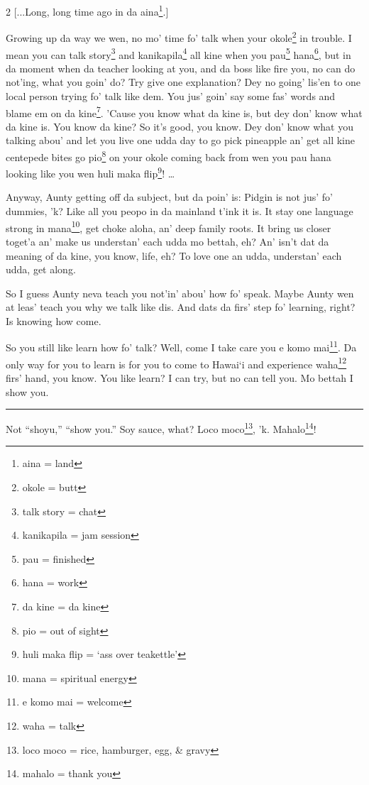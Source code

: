 \documentclass[12pt]{article}%
\begin{document}
\begin{multicols}{2}
[...Long, long time ago in da aina\footnote{aina = land}.]

Growing up da way we wen, no mo' time fo' talk when your okole\footnote{okole = butt} in trouble. I mean you can talk story\footnote{talk story = chat} and kanikapila\footnote{kanikapila = jam session} all kine when you pau\footnote{pau = finished} hana\footnote{hana = work}, but in da moment when da teacher looking at you, and da boss like fire you, no can do not'ing, what you goin' do? Try give one explanation? Dey no going' lis'en to one local person trying fo' talk like dem. You jus' goin' say some fas' words and blame em on da kine\footnote{da kine = da kine}. 'Cause you know what da kine is, but dey don' know what da kine is. You know da kine? So it's good, you know. Dey don' know what you talking abou' and let you live one udda day to go pick pineapple an' get all kine centepede bites go pio\footnote{pio = out of sight} on your okole coming back from wen you pau hana looking like you wen huli maka flip\footnote{huli maka flip = `ass over teakettle'}! \dots

Anyway, Aunty getting off da subject, but da poin' is: Pidgin is not jus' fo' dummies, 'k? Like all you peopo in da mainland t'ink it is. It stay one language strong in mana\footnote{mana = spiritual energy}, get choke aloha, an' deep family roots. It bring us closer toget'a an' make us understan' each udda mo bettah, eh? An' isn't dat da meaning of da kine, you know, life, eh? To love one an udda, understan' each udda, get along. 

So I guess Aunty neva teach you not'in' abou' how fo' speak. Maybe Aunty wen at leas' teach you why we talk like dis. And dats da firs' step fo' learning, right? Is knowing how come. 

So you still like learn how fo' talk? Well, come I take care you e komo mai\footnote{e komo mai = welcome}. Da only way for you to learn is for you to come to Hawai`i and experience waha\footnote{waha = talk} firs' hand, you know. You like learn? I can try, but no can tell you. Mo bettah I show you.

\end{multicols}

\hrule
\vspace{5mm}

Not ``shoyu,'' ``show you.'' Soy sauce, what? Loco moco\footnote{loco moco = rice, hamburger, egg, \& gravy}, 'k. Mahalo\footnote{mahalo = thank you}!
\end{document}
